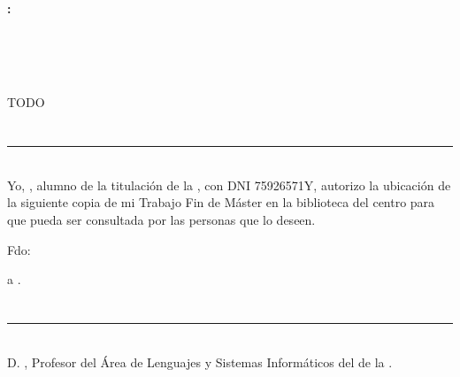 \thispagestyle{empty}

\cleardoublepage

\begin{center}
	{\large\bfseries \myTitle: \myEnglishSubtitle}\\
\end{center}

\begin{center}
	\myName \\
\end{center}

\vspace{0.7cm}
\\

\vspace{0.7cm}
\\

TODO

\chapter*{}
\thispagestyle{empty}

\noindent\rule[-1ex]{\textwidth}{2pt}\\[4.5ex]

Yo, \textbf{\myName}, alumno de la titulación \myDegree de la \textbf{\myFaculty}, con DNI 75926571Y, autorizo la ubicación de la siguiente copia de mi Trabajo Fin de Máster en la biblioteca del centro para que pueda ser consultada por las personas que lo deseen.

\vspace{6cm}

\noindent Fdo: \myName

\vspace{2cm}

\begin{flushright}
\myLocation a \myTime.
\end{flushright}


\chapter*{}
\thispagestyle{empty}

\noindent\rule[-1ex]{\textwidth}{2pt}\\[4.5ex]

D. \textbf{\myProf}, Profesor del Área de Lenguajes y Sistemas Informáticos del \myDepartment de la \myUni.

